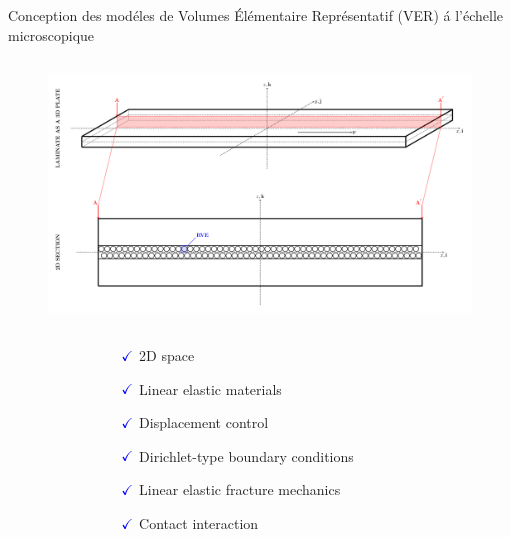\documentclass[final]{beamer}
\begin{document}
\begin{frame}
\begin{center}
\begin{minipage}{\textwidth}
\begin{exampleblock}{\rule[-0.6ex]{0pt}{50pt}\centering\LARGE Conception des mod\'eles de Volumes \'El\'ementaire Repr\'esentatif (VER) \'a l'\'echelle microscopique}
\begin{columns}
\begin{column}{0.3\textwidth}
\begin{center}
\begin{figure}[!h]
\centering
   \includegraphics[width=\columnwidth]{laminate-section.pdf}
\end{figure}
\begin{columns}
\begin{column}{0.25\columnwidth}
\end{column}
\begin{column}{0.5\columnwidth}
\begin{itemize}
\small
\item[$\color{blue}\checkmark$]2D space
\item[$\color{blue}\checkmark$]Linear elastic materials
\item[$\color{blue}\checkmark$]Displacement control
\item[$\color{blue}\checkmark$]Dirichlet-type boundary conditions
\item[$\color{blue}\checkmark$]Linear elastic fracture mechanics
\item[$\color{blue}\checkmark$]Contact interaction\\[5pt]
\end{itemize}
\end{column}
\begin{column}{0.25\columnwidth}
\end{column}
\end{columns}

\end{center}
\end{column}
\end{columns}
\end{exampleblock}
\end{minipage}
\end{center}
\end{frame}
\end{document}
